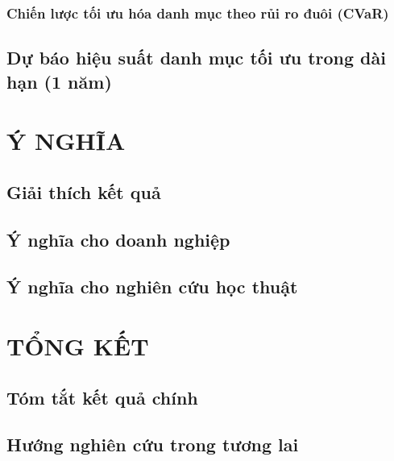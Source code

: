 \documentclass[a4paper,12pt]{article}
\begin{document}
\subsubsection{Chiến lược tối ưu hóa danh mục theo rủi ro đuôi (CVaR) }

\subsection{Dự báo hiệu suất danh mục tối ưu trong dài hạn (1 năm)}

\section{Ý NGHĨA}
\subsection{Giải thích kết quả}

\subsection{Ý nghĩa cho doanh nghiệp}

\subsection{Ý nghĩa cho nghiên cứu học thuật}

\section{ TỔNG KẾT}
\subsection{ Tóm tắt kết quả chính}

\subsection{ Hướng nghiên cứu trong tương lai}

\newpage
\nocite{*}
\printbibliography[heading=bibintoc, title={Tài liệu tham khảo}]
\newpage
\appendix
\setcounter{tocdepth}{0}

\end{document}
